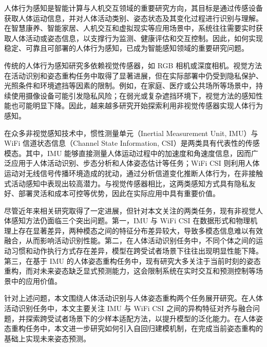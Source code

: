 


人体行为感知是智能计算与人机交互领域的重要研究方向，其目标是通过传感设备获取人体运动信息，并对人体活动类别、姿态状态及其变化过程进行识别与理解。在智慧康养、智能家居、人机交互和虚拟现实等应用场景中，系统往往需要实时获取人体活动或姿态信息，以支撑行为监测、健康评估和交互控制。因此，如何实现稳定、可靠且可部署的人体行为感知，已成为智能感知领域的重要研究问题。

传统的人体行为感知研究多依赖视觉传感器，如 RGB 相机或深度相机。视觉方法在活动识别和姿态重构任务中取得了显著进展，但在实际部署中仍受到隐私保护、光照条件和环境遮挡等因素的限制。例如，在家庭、医疗或公共场所等场景中，持续使用摄像设备可能引发隐私风险；在弱光或复杂遮挡环境下，视觉方法的感知性能也可能明显下降。因此，越来越多研究开始探索利用非视觉传感器实现人体行为感知。

在众多非视觉感知技术中，惯性测量单元（Inertial Measurement Unit, IMU）与 WiFi 信道状态信息（Channel State Information, CSI）是两类具有代表性的传感模态。其中，IMU 能够直接测量人体运动过程中的加速度和角速度信息，因而广泛应用于人体活动识别、步态分析和人体姿态估计等任务；WiFi CSI 则利用人体运动对无线信号传播环境造成的扰动，通过分析信道变化推断人体行为，在非接触式活动感知中表现出较高潜力。与视觉传感器相比，这两类感知方式具有隐私友好、部署灵活和成本可控等优势，因此在实际应用中具有重要价值。

尽管近年来相关研究取得了一定进展，但针对本文关注的两类任务，现有非视觉人体感知方法仍面临三个突出问题。第一，IMU 与 WiFi CSI 在数据形式和物理机理上存在显著差异，两种模态之间的特征分布差异较大，导致多模态信息难以有效融合，从而影响活动识别性能。第二，在人体活动识别任务中，不同个体之间的运动习惯和动作执行方式存在差异，模型在跨受试者场景下往往出现明显性能下降。第三，在基于 IMU 的人体姿态重构任务中，现有研究大多关注于当前时刻的姿态重构，而对未来姿态缺乏显式预测能力，这会限制系统在实时交互和预测控制等场景中的应用价值。

针对上述问题，本文围绕人体活动识别与人体姿态重构两个任务展开研究。在人体活动识别任务中，本文主要关注 IMU 与 WiFi CSI 之间的异构特征对齐与融合问题，并探索跨受试者场景下的少样本适配方法，以提升模型的泛化能力。在人体姿态重构任务中，本文进一步研究如何引入自回归建模机制，在完成当前姿态重构的基础上实现未来姿态预测。



